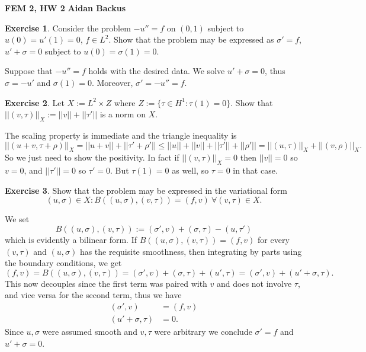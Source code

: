 \documentclass[10pt]{article}
\theoremstyle{definition}
\newtheorem{exer}{Exercise}
\begin{document}
\noindent
\large\textbf{FEM 2, HW 2} \hfill \textbf{Aidan Backus} \\

\begin{exer}
    Consider the problem $-u'' = f$ on $(0, 1)$ subject to $u(0) = u'(1) = 0$, $f \in L^2$.
    Show that the problem may be expressed as $\sigma' = f$, $u' + \sigma = 0$ subject to $u(0) = \sigma(1) = 0$.
\end{exer}

Suppose that $-u'' = f$ holds with the desired data. We solve $u' + \sigma = 0$, thus $\sigma = -u'$ and $\sigma(1) = 0$.
Moreover, $\sigma' = -u'' = f$.

\begin{exer}
    Let $X := L^2 \times Z$ where $Z := \{\tau \in H^1: \tau(1) = 0\}$.
    Show that $||(v, \tau)||_X := ||v|| + ||\tau'||$ is a norm on $X$.
\end{exer}

The scaling property is immediate and the triangle inequality is 
$$||(u + v, \tau + \rho)||_X = ||u + v|| + ||\tau' + \rho'|| \leq ||u|| + ||v|| + ||\tau'|| + ||\rho'|| = ||(u, \tau)||_X + ||(v, \rho)||_X.$$
So we just need to show the positivity.
In fact if $||(v, \tau)||_X = 0$ then $||v|| = 0$ so $v = 0$, and $||\tau'|| = 0$ so $\tau' = 0$.
But $\tau(1) = 0$ as well, so $\tau = 0$ in that case.

\begin{exer}
    Show that the problem may be expressed in the variational form 
    $$(u, \sigma) \in X: B((u, \sigma), (v, \tau)) = (f, v) ~\forall (v, \tau) \in X.$$
\end{exer}

We set 
$$B((u, \sigma), (v, \tau)) := (\sigma', v) + (\sigma, \tau) - (u, \tau')$$
which is evidently a bilinear form.
If $B((u, \sigma), (v, \tau)) = (f, v)$ for every $(v, \tau)$ and $(u, \sigma)$ has the requisite smoothness, then integrating by parts using the boundary conditions, we get 
$$(f, v) = B((u, \sigma), (v, \tau)) = (\sigma', v) + (\sigma, \tau) + (u', \tau) = (\sigma', v) + (u' + \sigma, \tau).$$
This now decouples since the first term was paired with $v$ and does not involve $\tau$, and vice versa for the second term, thus we have 
\begin{align*}
(\sigma', v) &= (f, v) \\
(u' + \sigma, \tau) &= 0.
\end{align*}
Since $u, \sigma$ were assumed smooth and $v, \tau$ were arbitrary we conclude $\sigma' = f$ and $u' + \sigma = 0$.
\end{document}
